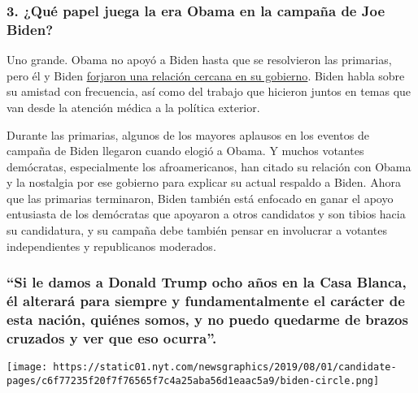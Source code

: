 \hypertarget{3-quuxe9-papel-juega-la-era-obama-en-la-campauxf1a-de-joe-biden}{%
\subsubsection{\texorpdfstring{\textbf{3. ¿Qué papel juega la era Obama
en la campaña de Joe
Biden?}}{3. ¿Qué papel juega la era Obama en la campaña de Joe Biden?}}\label{3-quuxe9-papel-juega-la-era-obama-en-la-campauxf1a-de-joe-biden}}

Uno grande. Obama no apoyó a Biden hasta que se resolvieron las
primarias, pero él y Biden
\href{https://www.nytimes.com/2019/08/16/us/politics/biden-obama-history.html}{forjaron
una relación cercana en su gobierno}. Biden habla sobre su amistad con
frecuencia, así como del trabajo que hicieron juntos en temas que van
desde la atención médica a la política exterior.

Durante las primarias, algunos de los mayores aplausos en los eventos de
campaña de Biden llegaron cuando elogió a Obama. Y muchos votantes
demócratas, especialmente los afroamericanos, han citado su relación con
Obama y la nostalgia por ese gobierno para explicar su actual respaldo a
Biden. Ahora que las primarias terminaron, Biden también está enfocado
en ganar el apoyo entusiasta de los demócratas que apoyaron a otros
candidatos y son tibios hacia su candidatura, y su campaña debe también
pensar en involucrar a votantes independientes y republicanos moderados.

\hypertarget{si-le-damos-a-donald-trump-ocho-auxf1os-en-la-casa-blanca-uxe9l-alteraruxe1-para-siempre-y-fundamentalmente-el-caruxe1cter-de-esta-naciuxf3n-quiuxe9nes-somos-y-no-puedo-quedarme-de-brazos-cruzados-y-ver-que-eso-ocurra}{%
\subsubsection{``Si le damos a Donald Trump ocho años en la Casa Blanca,
él alterará para siempre y fundamentalmente el carácter de esta nación,
quiénes somos, y no puedo quedarme de brazos cruzados y ver que eso
ocurra''.}\label{si-le-damos-a-donald-trump-ocho-auxf1os-en-la-casa-blanca-uxe9l-alteraruxe1-para-siempre-y-fundamentalmente-el-caruxe1cter-de-esta-naciuxf3n-quiuxe9nes-somos-y-no-puedo-quedarme-de-brazos-cruzados-y-ver-que-eso-ocurra}}

\texttt{[image: https://static01.nyt.com/newsgraphics/2019/08/01/candidate-pages/c6f77235f20f7f76565f7c4a25aba56d1eaac5a9/biden-circle.png]}


